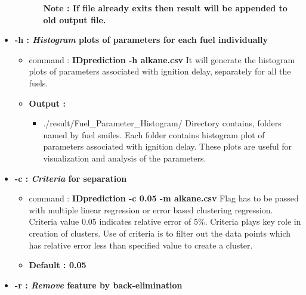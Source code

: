 \documentclass[12pt]{article}
\begin{document}
\begin{itemize}[wide = 0pt, labelwidth = 1.3333em, labelsep = 0.3333em, leftmargin = \dimexpr{} + \relax ]
\begin{itemize}
\begin{itemize}
\begin{itemize}
						\end{itemize}
					\textbf{		\textbf{Note} : If file already exits then result will be appended to old output file.}
				\end{itemize}
				
				
			\end{itemize}
			
		
		\newpage
		
			\item \textbf{-h : \textit{Histogram} plots of parameters for each fuel individually } \\
			\begin{itemize}
			\item command : \textbf{IDprediction -h alkane.csv} 
			\subitem   It will generate the histogram plots of parameters associated with ignition delay, separately for all the fuels. \\
			\item \textbf{Output :}			
			\begin{itemize}

					\item   ./result/Fuel\_Parameter\_Histogram/
					\subitem	Directory contains, folders named by fuel smiles. Each folder contains histogram plot of parameters associated with ignition delay. These plots are useful for visualization and analysis of the parameters. 	
			\end{itemize}
				\end{itemize}
			


			
		\item \textbf{-c : \textit{Criteria} for separation } \\
		
			\begin{itemize}

				\item command : \textbf{IDprediction -c 0.05 -m alkane.csv} 
				\subitem Flag has to be passed with multiple  linear regression or error based clustering regression. Criteria value 0.05 indicates relative error of 5\%. Criteria plays key role in creation of clusters. Use of criteria is to filter out the data points which has relative error less than specified value to create a cluster.	
				\item \textbf{Default : 0.05	}		
			\end{itemize}
			
		\item \textbf{-r : \textit{Remove} feature by back-elimination } \\
				\begin{itemize}


\end{itemize}
\end{itemize}
\end{document}

